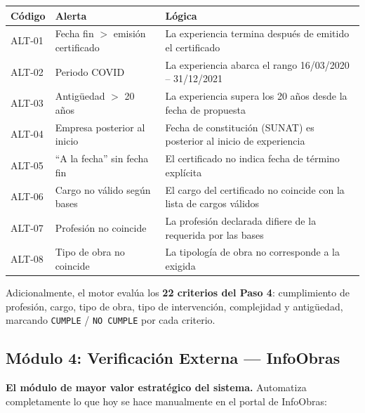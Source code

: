 \documentclass[11pt,a4paper]{article}
\begin{document}
\begin{center}
\begin{tabular}{|>{\centering\arraybackslash}m{1.2cm}|>{\raggedright\arraybackslash}m{4.5cm}|>{\raggedright\arraybackslash}m{6.5cm}|}
\hline
\textbf{Código} & \textbf{Alerta} & \textbf{Lógica} \\
\hline
ALT-01 & Fecha fin $>$ emisión certificado & La experiencia termina después de emitido el certificado \\
\hline
ALT-02 & Periodo COVID & La experiencia abarca el rango 16/03/2020 -- 31/12/2021 \\
\hline
ALT-03 & Antigüedad $>$ 20 años & La experiencia supera los 20 años desde la fecha de propuesta \\
\hline
ALT-04 & Empresa posterior al inicio & Fecha de constitución (SUNAT) es posterior al inicio de experiencia \\
\hline
ALT-05 & ``A la fecha'' sin fecha fin & El certificado no indica fecha de término explícita \\
\hline
ALT-06 & Cargo no válido según bases & El cargo del certificado no coincide con la lista de cargos válidos \\
\hline
ALT-07 & Profesión no coincide & La profesión declarada difiere de la requerida por las bases \\
\hline
ALT-08 & Tipo de obra no coincide & La tipología de obra no corresponde a la exigida \\
\hline
\end{tabular}
\end{center}

Adicionalmente, el motor evalúa los \textbf{22 criterios del Paso 4}: cumplimiento de profesión, cargo, tipo de obra, tipo de intervención, complejidad y antigüedad, marcando \texttt{CUMPLE} / \texttt{NO CUMPLE} por cada criterio.

\subsection{Módulo 4: Verificación Externa — InfoObras}

\textbf{El módulo de mayor valor estratégico del sistema.} Automatiza completamente lo que hoy se hace manualmente en el portal de InfoObras:
\end{document}
